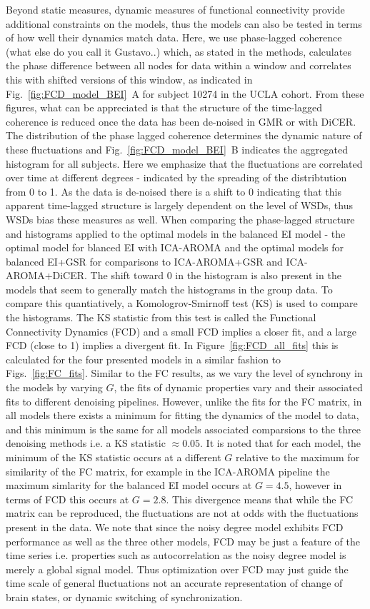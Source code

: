 \documentclass[oneside]{zHenriquesLab-StyleBioRxiv}
\begin{document}
Beyond static measures, dynamic measures of functional connectivity provide additional constraints on the models, thus the models can also be tested in terms of how well their dynamics match data. Here, we use phase-lagged coherence (what else do you call it Gustavo..) which, as stated in the methods, calculates the phase difference between all nodes for data within a window and correlates this with shifted versions of this window, as indicated in Fig.~\ref{fig:FCD_model_BEI}~A for subject 10274 in the UCLA cohort. From these figures, what can be appreciated is that the structure of the time-lagged coherence is reduced once the data has been de-noised in GMR or with DiCER. The distribution of the phase lagged coherence determines the dynamic nature of these fluctuations and Fig.~\ref{fig:FCD_model_BEI}~B indicates the aggregated histogram for all subjects. Here we emphasize that the fluctuations are correlated over time at different degrees - indicated by the spreading of the distribtution from 0 to 1. As the data is de-noised there is a shift to 0 indicating that this apparent time-lagged structure is largely dependent on the level of WSDs, thus WSDs bias these measures as well. When comparing the phase-lagged structure and histograms applied to the optimal models in the balanced EI model - the optimal model for blanced EI with ICA-AROMA and the optimal models for balanced EI+GSR for comparisons to ICA-AROMA+GSR and ICA-AROMA+DiCER. The shift toward 0 in the histogram is also present in the models that seem to generally match the histograms in the group data. To compare this quantiatively, a Komologrov-Smirnoff test (KS) is used to compare the histograms. The KS statistic from this test is called the Functional Connectivity Dynamics (FCD) and a small FCD implies a closer fit, and a large FCD (close to 1) implies a divergent fit. 
In Figure~\ref{fig:FCD_all_fits} this is calculated for the four presented models in a similar fashion to Figs.~\ref{fig:FC_fits}. Similar to the FC results, as we vary the level of synchrony in the models by varying $G$, the fits of dynamic properties vary and their associated fits to different denoising pipelines. However, unlike the fits for the FC matrix, in all models there exists a minimum for fitting the dynamics of the model to data, and this minimum is the same for all models associated comparsions to the three denoising methods i.e. a KS statistic $\approx 0.05$. It is noted that for each model, the minimum of the KS statistic occurs at a different $G$ relative to the maximum for similarity of the FC matrix, for example in the ICA-AROMA pipeline the maximum simlarity for the balanced EI model occurs at $G=4.5$, however in terms of FCD this occurs at $G=2.8$. This divergence means that while the FC matrix can be reproduced, the fluctuations are not at odds with the fluctuations present in the data. We note that since the noisy degree model exhibits FCD performance as well as the three other models, FCD may be just a feature of the time series i.e. properties such as autocorrelation as the noisy degree model is merely a global signal model. Thus optimization over FCD may just guide the time scale of general fluctuations not an accurate representation of change of brain states, or dynamic switching of synchronization. 
\end{document}
